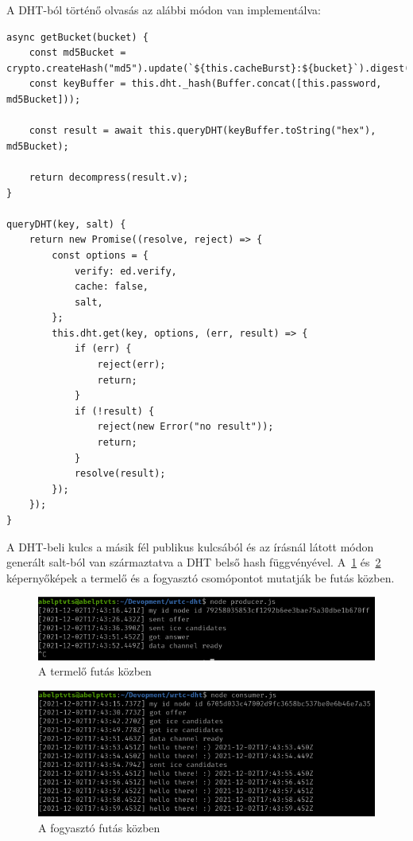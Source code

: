 A DHT-ból történő olvasás az alábbi módon van implementálva:

\begin{lstlisting}[label={lst:lstlisting7}]
async getBucket(bucket) {
    const md5Bucket = crypto.createHash("md5").update(`${this.cacheBurst}:${bucket}`).digest();
    const keyBuffer = this.dht._hash(Buffer.concat([this.password, md5Bucket]));

    const result = await this.queryDHT(keyBuffer.toString("hex"), md5Bucket);

    return decompress(result.v);
}

queryDHT(key, salt) {
    return new Promise((resolve, reject) => {
        const options = {
            verify: ed.verify,
            cache: false,
            salt,
        };
        this.dht.get(key, options, (err, result) => {
            if (err) {
                reject(err);
                return;
            }
            if (!result) {
                reject(new Error("no result"));
                return;
            }
            resolve(result);
        });
    });
}
\end{lstlisting}
A DHT-beli kulcs a másik fél publikus kulcsából és az írásnál látott módon generált salt-ból van származtatva a DHT belső
hash függvényével.
A~\ref{fig:prod} és~\ref{fig:cons} képernyőképek a termelő és a fogyasztó csomópontot mutatják be futás közben.

\begin{figure}[!ht]
    \centering
    \includegraphics[width=120mm, keepaspectratio]{figures/producer}
    \caption{A termelő futás közben}
    \label{fig:prod}
\end{figure}

\begin{figure}[!ht]
    \centering
    \includegraphics[width=120mm, keepaspectratio]{figures/consumer}
    \caption{A fogyasztó futás közben}
    \label{fig:cons}
\end{figure}


